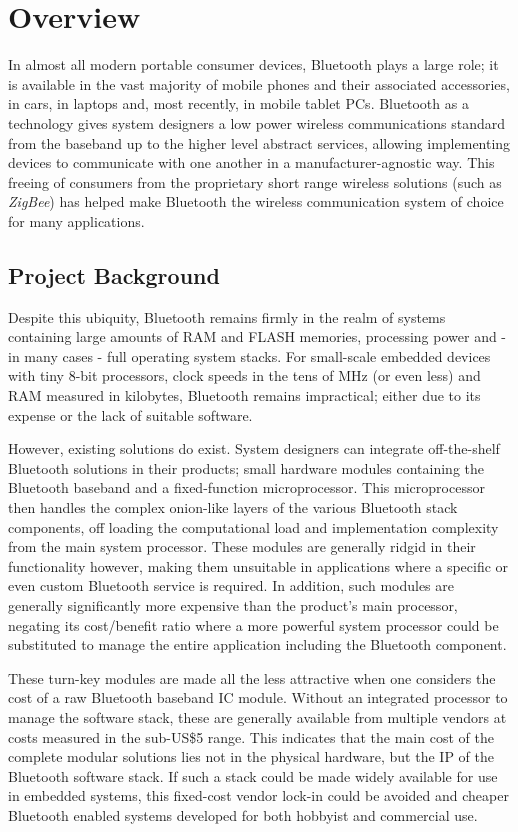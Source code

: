 \chapter{Overview}
\label{Chapter1}

In almost all modern portable consumer devices, Bluetooth plays a large role; it is available in the vast majority of mobile phones and their associated accessories, in cars, in laptops and, most recently, in mobile tablet PCs. Bluetooth as a technology gives system designers a low power wireless communications standard from the baseband up to the higher level abstract services, allowing implementing devices to communicate with one another in a manufacturer-agnostic way. This freeing of consumers from the proprietary short range wireless solutions (such as \textit{ZigBee}) has helped make Bluetooth the wireless communication system of choice for many applications.

\section{Project Background}

Despite this ubiquity, Bluetooth remains firmly in the realm of systems containing large amounts of RAM and FLASH memories, processing power and - in many cases - full operating system stacks. For small-scale embedded devices with tiny 8-bit processors, clock speeds in the tens of MHz (or even less) and RAM measured in kilobytes, Bluetooth remains impractical; either due to its expense or the lack of suitable software.

However, existing solutions do exist. System designers can integrate off-the-shelf Bluetooth solutions in their products; small hardware modules containing the Bluetooth baseband and a fixed-function microprocessor. This microprocessor then handles the complex onion-like layers of the various Bluetooth stack components, off loading the computational load and implementation complexity from the main system processor. These modules are generally ridgid in their functionality however, making them unsuitable in applications where a specific or even custom Bluetooth service is required. In addition, such modules are generally significantly more expensive than the product's main processor, negating its cost/benefit ratio where a more powerful system processor could be substituted to manage the entire application including the Bluetooth component.

These turn-key modules are made all the less attractive when one considers the cost of a raw Bluetooth baseband IC module. Without an integrated processor to manage the software stack, these are generally available from multiple vendors at costs measured in the sub-US\$5 range. This indicates that the main cost of the complete modular solutions lies not in the physical hardware, but the IP of the Bluetooth software stack. If such a stack could be made widely available for use in embedded systems, this fixed-cost vendor lock-in could be avoided and cheaper Bluetooth enabled systems developed for both hobbyist and commercial use.

